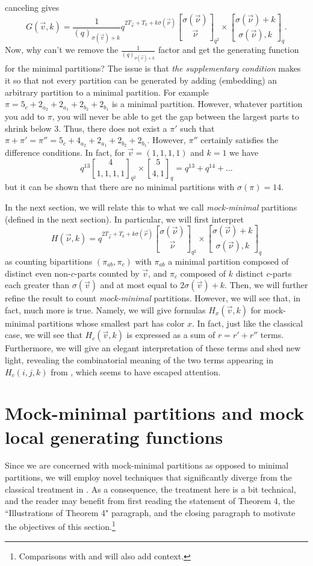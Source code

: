 \documentclass[12pt,a4paper]{amsart}
\theoremstyle{definition}
\theoremstyle{notation}
\theoremstyle{corollary}
\begin{document}
canceling gives 
$$G(\vec{v},k)= \frac{1}{(q)_{\sigma(\vec{v})+k}}q^{2T_{\vec{\nu}}+T_k+k\sigma(\vec{\nu})}{\sigma(\vec{\nu})\brack \vec{\nu}}_{q^2}\times {\sigma(\vec{\nu})+k\brack \sigma(\vec{\nu}),k}_{q}.$$
Now, why can't we remove the $\frac{1}{(q)_{\sigma(\vec{v})+k}}$ factor and get the generating function for the minimal partitions? The issue is that \textit{the supplementary condition} makes it so that not every partition can be generated by adding (embedding) an arbitrary partition to a minimal partition. For example $\pi=5_c+2_{a_2}+2_{a_1}+2_{b_2}+2_{b_1}$ is a minimal partition. However, whatever partition you add to $\pi$, you will never be able to get the gap between the largest parts to shrink below $3$. Thus, there does not exist a $\pi'$ such that $\pi+\pi'=\pi''=5_c+4_{a_2}+2_{a_1}+2_{b_2}+2_{b_1}$. However, $\pi ''$ certainly satisfies the difference conditions. In fact, for $\vec{v}=(1,1,1,1)$ and $k=1$ we have
\[q^{13}{4\brack 1,1,1,1}_{q^2}\times {5\brack 4,1}_{q}=q^{13}+q^{14}+\dots\]
but it can be shown that there are no minimal partitions with $\sigma(\pi)=14$.

In the next section, we will relate this to what we call \textit{mock-minimal} partitions (defined in the next section). In particular, we will first interpret \[H(\vec{\nu},k)= q^{2T_{\vec{\nu}}+T_k+k\sigma(\vec{\nu})}{\sigma(\vec{\nu})\brack \vec{\nu}}_{q^2}\times {\sigma(\vec{\nu})+k\brack \sigma(\vec{\nu}),k}_{q}\]
as counting bipartitions $(\pi_{ab},\pi_c)$ with $\pi_{ab}$ a minimal partition composed of distinct even non-$c$-parts counted by $\vec{v}$, and $\pi_c$ composed of $k$ distinct $c$-parts each greater than $\sigma(\vec{v})$ and at most equal to $2\sigma(\vec{v})+k$. Then, we will further refine the result to count \textit{mock-minimal} partitions.  However, we will see that, in fact, much more is true. Namely, we will give formulas $H_x(\vec{v},k)$ for mock-minimal partitions whose smallest part has color $x$. In fact, just like the classical case, we will see that $H_c(\vec{v},k)$ is expressed as a sum of $r=r'+r''$ terms. Furthermore, we will give an elegant interpretation of these terms and shed new light, revealing the combinatorial meaning of the two terms appearing in $H_c(i,j,k)$ from \cite{KAGEABG95}, which seems to have escaped attention.



\section{Mock-minimal partitions and mock local generating functions}
Since we are concerned with mock-minimal partitions as opposed to minimal partitions, we will employ novel techniques that significantly diverge from the classical treatment in \cite{KAGEABG95}. As a consequence, the treatment here is a bit technical, and the reader may benefit from first reading the statement of Theorem 4, the ``Illustrations of Theorem 4" paragraph, and the closing paragraph to motivate the objectives of this section.\footnote{Comparisons with \cite[Sec.~3]{KAGEABG95} and \cite[Sec.~5]{KAGEABG95G} will also add context.}
\end{document}
